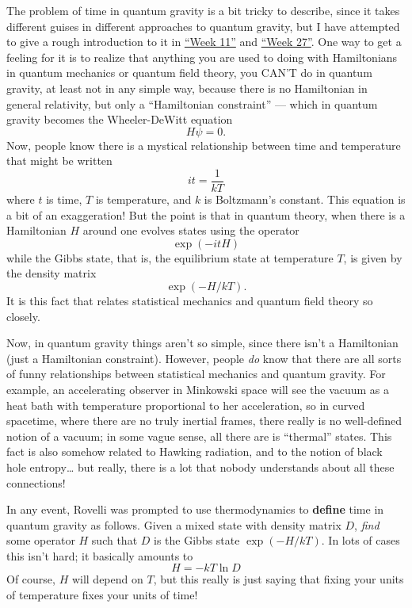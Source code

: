 \documentclass[12pt]{article}
\def\tightlist{}
\renewcommand{\texttt}[1]{%
  \begingroup
  \ttfamily
  \begingroup\lccode`~=`/\lowercase{\endgroup\def~}{/\discretionary{}{}{}}%
  \begingroup\lccode`~=`[\lowercase{\endgroup\def~}{[\discretionary{}{}{}}%
  \begingroup\lccode`~=`.\lowercase{\endgroup\def~}{.\discretionary{}{}{}}%
  \catcode`/=\active\catcode`[=\active\catcode`.=\active
  \scantokens{#1\noexpand}%
  \endgroup
}
\begin{document}
\noindent
The problem of time in quantum gravity is a bit tricky to describe,
since it takes different guises in different approaches to quantum
gravity, but I have attempted to give a rough introduction to it in
\protect\hyperlink{week11}{``Week 11''} and
\protect\hyperlink{week27}{``Week 27''}. One way to get a feeling for it
is to realize that anything you are used to doing with Hamiltonians in
quantum mechanics or quantum field theory, you CAN'T do in quantum
gravity, at least not in any simple way, because there is no Hamiltonian
in general relativity, but only a ``Hamiltonian constraint'' --- which
in quantum gravity becomes the Wheeler-DeWitt equation \[H \psi = 0.\]
Now, people know there is a mystical relationship between time and
temperature that might be written \[it = \frac{1}{kT}\] where \(t\) is
time, \(T\) is temperature, and \(k\) is Boltzmann's constant. This
equation is a bit of an exaggeration! But the point is that in quantum
theory, when there is a Hamiltonian \(H\) around one evolves states
using the operator \[\exp(-itH)\] while the Gibbs state, that is, the
equilibrium state at temperature \(T\), is given by the density matrix
\[\exp(-H/kT).\] It is this fact that relates statistical mechanics and
quantum field theory so closely.

Now, in quantum gravity things aren't so simple, since there isn't a
Hamiltonian (just a Hamiltonian constraint). However, people \emph{do}
know that there are all sorts of funny relationships between statistical
mechanics and quantum gravity. For example, an accelerating observer in
Minkowski space will see the vacuum as a heat bath with temperature
proportional to her acceleration, so in curved spacetime, where there
are no truly inertial frames, there really is no well-defined notion of
a vacuum; in some vague sense, all there are is ``thermal'' states. This
fact is also somehow related to Hawking radiation, and to the notion of
black hole entropy\ldots{} but really, there is a lot that nobody
understands about all these connections!

In any event, Rovelli was prompted to use thermodynamics to
\textbf{define} time in quantum gravity as follows. Given a mixed state
with density matrix \(D\), \emph{find} some operator \(H\) such that
\(D\) is the Gibbs state \(\exp(-H/kT)\). In lots of cases this isn't
hard; it basically amounts to \[H = -kT \ln D\] Of course, \(H\) will
depend on \(T\), but this really is just saying that fixing your units
of temperature fixes your units of time!
\end{document}

